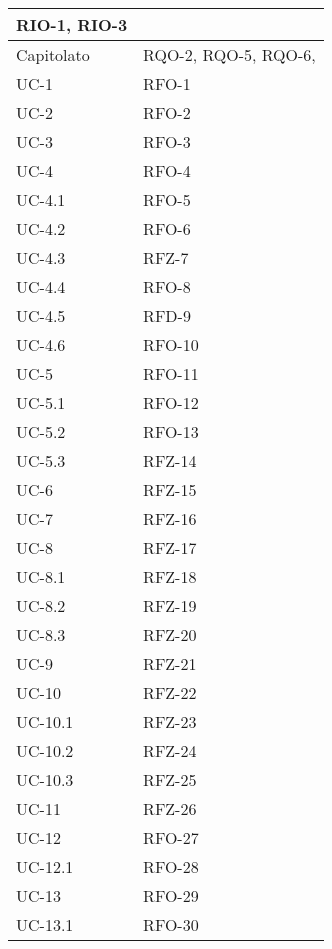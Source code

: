 \begin{xltabular}{\textwidth}{|X| X |}
                RIO-1, \newline
                RIO-3 \\
    \hline
    Capitolato & RQO-2, \newline 
                 RQO-5, \newline 
                 RQO-6, \newline 
    \\
    \hline
    UC-1 & RFO-1  \\
    \hline
    UC-2 & RFO-2  \\
    \hline
    UC-3 & RFO-3  \\
    \hline
    UC-4 & RFO-4 \\
    \hline
    UC-4.1 & RFO-5\\
    \hline
    UC-4.2 & RFO-6\\
    \hline
    UC-4.3 & RFZ-7 \\
    \hline
    UC-4.4 & RFO-8\\ 
    \hline
    UC-4.5 & RFD-9\\
    \hline
    UC-4.6 & RFO-10\\
    \hline
    UC-5 & RFO-11\\
    \hline
    UC-5.1 & RFO-12\\
    \hline
    UC-5.2 & RFO-13\\
    \hline
    UC-5.3 & RFZ-14 \\
    \hline
    UC-6 & RFZ-15\\
    \hline
    UC-7 & RFZ-16 \\
    \hline
    UC-8 & RFZ-17\\
    \hline
    UC-8.1 & RFZ-18\\
    \hline
    UC-8.2 & RFZ-19\\
    \hline
    UC-8.3 & RFZ-20\\
    \hline
    UC-9 & RFZ-21\\
    \hline
    UC-10 & RFZ-22\\
    \hline
    UC-10.1 & RFZ-23 \\
    \hline
    UC-10.2 & RFZ-24 \\
    \hline
    UC-10.3 & RFZ-25 \\
    \hline
    UC-11 & RFZ-26 \\
    \hline
    UC-12 & RFO-27\\
    \hline
    UC-12.1 & RFO-28\\
    \hline
    UC-13 & RFO-29\\
    \hline
    UC-13.1 & RFO-30 \\
    \hline

\end{xltabular}
